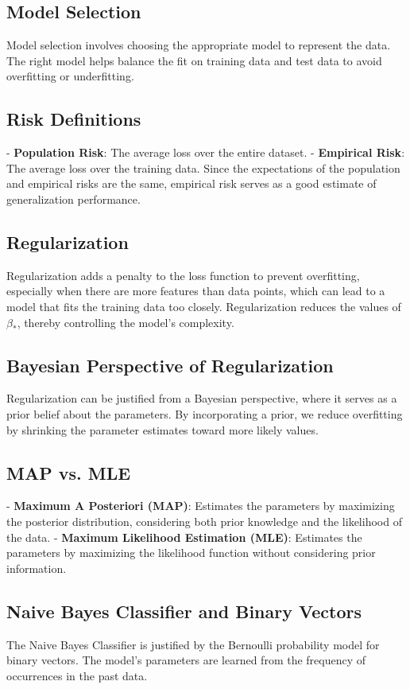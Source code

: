 \documentclass[10pt]{article}
\begin{document}
\begin{multicols}{2}
\subsection*{Model Selection}
Model selection involves choosing the appropriate model to represent the data. The right model helps balance the fit on training data and test data to avoid overfitting or underfitting.

\subsection*{Risk Definitions}
- \textbf{Population Risk}: The average loss over the entire dataset.
- \textbf{Empirical Risk}: The average loss over the training data. Since the expectations of the population and empirical risks are the same, empirical risk serves as a good estimate of generalization performance.

\subsection*{Regularization}
Regularization adds a penalty to the loss function to prevent overfitting, especially when there are more features than data points, which can lead to a model that fits the training data too closely. Regularization reduces the values of \( \beta_* \), thereby controlling the model's complexity.

\subsection*{Bayesian Perspective of Regularization}
Regularization can be justified from a Bayesian perspective, where it serves as a prior belief about the parameters. By incorporating a prior, we reduce overfitting by shrinking the parameter estimates toward more likely values.

\subsection*{MAP vs. MLE}
- \textbf{Maximum A Posteriori (MAP)}: Estimates the parameters by maximizing the posterior distribution, considering both prior knowledge and the likelihood of the data.
- \textbf{Maximum Likelihood Estimation (MLE)}: Estimates the parameters by maximizing the likelihood function without considering prior information.

\subsection*{Naive Bayes Classifier and Binary Vectors}
The Naive Bayes Classifier is justified by the Bernoulli probability model for binary vectors. The model's parameters are learned from the frequency of occurrences in the past data.

\end{multicols}
\end{document}
